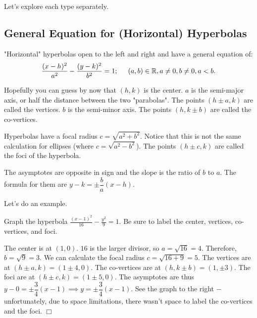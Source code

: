 \documentclass[../book.tex]{subfiles}
\begin{document}
Let's explore each type separately.
\subsection{General Equation for (Horizontal) Hyperbolas}
\noindent "Horizontal" hyperbolas open to the left and right and have a general equation of:
$$ \frac{(x-h)^2}{a^2} - \frac{(y-k)^2}{b^2} = 1; \hspace{5mm} (a,b)\in\mathbb{R},a\neq 0,b\neq 0,a<b.$$

Hopefully you can guess by now that $(h,k)$ is the center.  $a$ is the semi-major axis, or half the distance between the two "parabolas".  The points $(h \pm a,k)$ are called the vertices.  $b$ is the semi-minor axis.  The points $(h,k \pm b)$ are called the co-vertices.

Hyperbolas have a focal radius $c=\sqrt{a^2+b^2}$.  Notice that this is not the same calculation for ellipses (where $c=\sqrt{a^2-b^2}$).  The points $(h \pm c,k)$ are called the foci of the hyperbola.

\begin{wrapfigure}{r}{5cm}
\end{wrapfigure}

The asymptotes are opposite in sign and the slope is the ratio of $b$ to $a$.  The formula for them are $y-k=\pm\dfrac{b}{a}(x-h)$.

Let's do an example.
\begin{example}
Graph the hyperbola $\frac{(x-1)^2}{16} - \frac{y^2}{9} = 1$.  Be sure to label the center, vertices, co-vertices, and foci.
\end{example}
\begin{solution}
The center is at $(1,0)$.  $16$ is the larger divisor, so $a=\sqrt{16}=4$.  Therefore, $b=\sqrt{9}=3$.  We can calculate the focal radius $c=\sqrt{16+9}=5$.  The vertices are at $(h \pm a ,k) = (1 \pm 4,0)$.  The co-vertices are at $(h,k \pm b)=(1,\pm 3)$.  The foci are at $(h \pm c,k) = (1 \pm 5, 0)$.  The asymptotes are thus $y-0=\pm\dfrac{3}{4}(x-1) \implies y=\pm\dfrac{3}{4}(x-1)$.  See the graph to the right $-$ unfortunately, due to space limitations, there wasn't space to label the co-vertices and the foci. $\Box$
\end{solution}
\end{document}
